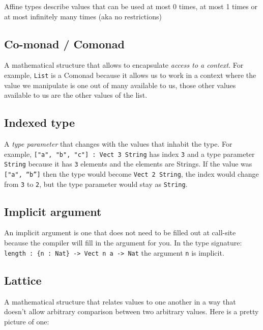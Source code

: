 \documentclass[
]{article}
\begin{document}
Affine types describe values that can be used at most 0 times, at most 1
times or at most infinitely many times (aka no restrictions)

\hypertarget{co-monad-comonad}{%
\subsection{Co-monad / Comonad}\label{co-monad-comonad}}

A mathematical structure that allows to encapsulate \emph{access to a
context}. For example, \texttt{List} is a Comonad because it allows us
to work in a context where the value we manipulate is one out of many
available to us, those other values available to us are the other values
of the list.

\hypertarget{indexed-type}{%
\subsection{Indexed type}\label{indexed-type}}

A \emph{type parameter} that changes with the values that inhabit the
type. For example, \texttt{{[}"a",\ "b",\ "c"{]}\ :\ Vect\ 3\ String}
has index \texttt{3} and a type parameter \texttt{String} because it has
\texttt{3} elements and the elements are Strings. If the value was
\texttt{{[}\textasciigrave{}"a",\ “b”{]}} then the type would become
\texttt{Vect\ 2\ String}, the index would change from \texttt{3} to
\texttt{2}, but the type parameter would stay as \texttt{String}.

\hypertarget{implicit-argument}{%
\subsection{Implicit argument}\label{implicit-argument}}

An implicit argument is one that does not need to be filled out at
call-site because the compiler will fill in the argument for you. In the
type signature:
\texttt{length\ :\ \{n\ :\ Nat\}\ -\textgreater{}\ Vect\ n\ a\ -\textgreater{}\ Nat}
the argument \texttt{n} is implicit.

\hypertarget{lattice}{%
\subsection{Lattice}\label{lattice}}

A mathematical structure that relates values to one another in a way
that doesn't allow arbitrary comparison between two arbitrary values.
Here is a pretty picture of one:
\end{document}

